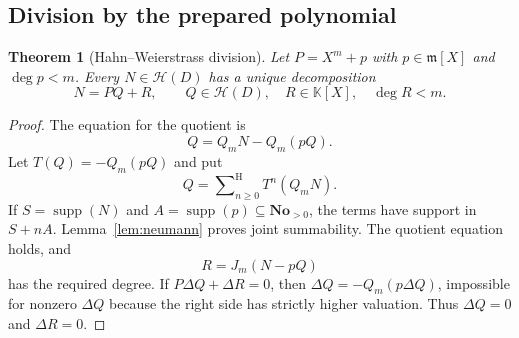 \documentclass[11pt,oneside]{article}
\newtheorem{theorem}{Theorem}[section]
\theoremstyle{definition}\newtheorem{definition}[theorem]{Definition}
\newcommand{\No}{\mathbf{No}}
\newcommand{\K}{\mathbb K}
\newcommand{\HH}{\mathcal H}
\newcommand{\mm}{\mathfrak m}
\newcommand{\supp}{\operatorname{supp}}
\newcommand{\Hsum}{\mathop{\sum}\nolimits^{\mathrm H}}
\begin{document}
\subsection{Division by the prepared polynomial}
\begin{theorem}[Hahn--Weierstrass division]\label{thm:division}
Let $P=X^m+p$ with $p\in\mm[X]$ and $\deg p<m$. Every $N\in\HH(D)$ has a unique decomposition
\[
 N=PQ+R,\qquad Q\in\HH(D),\quad R\in\K[X],\quad\deg R<m.
\]
\end{theorem}
\begin{proof}
The equation for the quotient is
\[
 Q=Q_mN-Q_m(pQ).
\]
Let $T(Q)=-Q_m(pQ)$ and put
\[
 Q=\Hsum_{n\geq0}T^n(Q_mN).
\]
If $S=\supp(N)$ and $A=\supp(p)\subseteq\No_{>0}$, the terms have support in $S+nA$. Lemma~\ref{lem:neumann} proves joint summability. The quotient equation holds, and
\[
 R=J_m(N-pQ)
\]
has the required degree. If $P\Delta Q+\Delta R=0$, then
$\Delta Q=-Q_m(p\Delta Q)$, impossible for nonzero $\Delta Q$ because the right side has strictly higher valuation. Thus $\Delta Q=0$ and $\Delta R=0$.
\end{proof}
\end{document}
